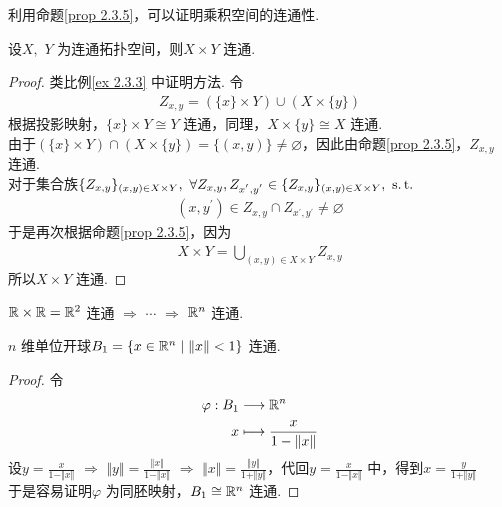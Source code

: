 	\newpage
	利用命题\ref{prop 2.3.5}，可以证明乘积空间的连通性.
	\begin{proposition}
		设$X , \,\, Y$ 为连通拓扑空间，则$X \times Y$ 连通.
		
		\vspace*{2em}
		\begin{proof}
			类比例\ref{ex 2.3.3} 中证明方法. 令
			\begin{align}
				Z_{x , y} = ( \{ x \} \times Y ) \cup ( X \times \{ y \} )
			\end{align}
			根据投影映射，$\{ x \} \times Y \cong Y$ 连通，同理，$X \times \{ y \} \cong X$ 连通.\\
			由于$(\{ x \} \times Y) \cap ( X \times \{ y \} ) = \{ (x , y) \} \neq \varnothing$，因此由命题\ref{prop 2.3.5}，$Z_{x , y}$ 连通.\\
			对于集合族$\{ Z_{x , y} \}_{(x , y) \in X \times Y} , \,\, \forall Z_{x , y} , Z_{x^{'} , y^{'}} \in \{ Z_{x , y} \}_{(x , y) \in X \times Y} , \,\, \operatorname{s.t.}$
			\begin{align}
				(x , y^{'}) \in Z_{x , y} \cap Z_{x^{'} , y^{'}} \neq \varnothing
			\end{align}
			于是再次根据命题\ref{prop 2.3.5}，因为
			\begin{align}
				X \times Y = \bigcup_{(x , y) \in X \times Y}{Z_{x , y}}
			\end{align}
			所以$X \times Y$ 连通.
		\end{proof}
	\end{proposition}
	
	\vspace*{2em}
	\begin{example}
		$\mathbb{R} \times \mathbb{R} = \mathbb{R}^2$ 连通 $\Rightarrow \,\, \cdots \,\, \Rightarrow$ $\mathbb{R}^n$ 连通.
	\end{example}
	
	\begin{example}
		$n$ 维单位开球$B_{1} = \{ x \in \mathbb{R}^n \mid \Vert x \Vert < 1 \}$ 连通.
		
		\vspace*{2em}
		\begin{proof}
			令
			\begin{align}
				\varphi : B_1 &\longrightarrow \mathbb{R}^n \\
				x &\longmapsto \frac{x}{1 - \Vert x \Vert}
			\end{align}
			设$y = \frac{x}{1 - \Vert x \Vert} \,\, \Rightarrow \,\, \Vert y \Vert = \frac{\Vert x \Vert}{1 - \Vert x \Vert} \,\, \Rightarrow \,\, \Vert x \Vert = \frac{\Vert y \Vert}{1 + \Vert y \Vert}$，代回$y = \frac{x}{1 - \Vert x \Vert}$ 中，得到$x = \frac{y}{1 + \Vert y \Vert}$\\
			于是容易证明$\varphi$ 为同胚映射，$B_1 \cong \mathbb{R}^n$ 连通.
		\end{proof}
	\end{example}
	
